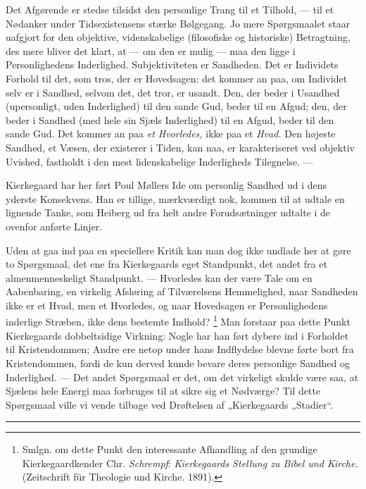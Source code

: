 \documentclass[12pt,a4paper,openany]{book}
\newcommand{\opage}[1]{\marginnote{\footnotesize\textit{[#1]}}}
\begin{document}
Det Afgørende er stedse tilsidst den personlige Trang til et Tilhold, --- til
et Nødanker under Tidsexistensens stærke Bølgegang. Jo mere Spørgsmaalet staar
uafgjort for den objektive, videnskabelige (filosofiske og historiske)
Betragtning, des mere bliver det klart, at --- om den er mulig --- maa den
ligge i Personlighedens Inderlighed. Subjektiviteten er Sandheden. Det er
Individets Forhold til det, som tros, der er Hovedsagen: det kommer an paa, om
Individet selv er i Sandhed, selvom det, det tror, er usandt. Den, der beder i
Usandhed (upersonligt, uden Inderlighed) til den sande Gud, beder til en Afgud;
den, der beder i Sandhed (med hele sin Sjæls Inderlighed) til en Afgud, beder
til den sande Gud. Det kommer an paa \textit{et Hvorledes,} ikke paa et
\textit{Hvad.} Den højeste Sandhed, et Væsen, der existerer i Tiden, kan naa,
er karakteriseret ved objektiv Uvished, fastholdt i den mest lidenskabelige
Inderligheds Tilegnelse. ---

Kierkegaard har her ført Poul Møllers Ide om personlig Sandhed ud i dens
yderste Konsekvens. Han er tillige, mærkværdigt nok, kommen til at udtale en
lignende Tanke, som Heiberg ud fra helt andre Forudsætninger udtalte i de
ovenfor anførte Linjer.

Uden at gaa ind paa en speciellere Kritik kan man dog ikke undlade her at gøre
to Spørgsmaal, det ene fra Kierkegaards eget Standpunkt, det andet fra et
almenmenneskeligt Standpunkt. --- Hvorledes kan der være Tale om en
Aabenbaring, en virkelig Afsløring af Tilværelsens Hemmelighed, naar Sandheden
ikke er et Hvad, men et Hvorledes, og naar Hovedsagen er Personlighedens
inderlige Stræben, ikke dens bestemte Indhold?%
\footnote[1]{Smlgn. om dette Punkt den interessante Afhandling af den grundige
Kierkegaardkender Chr. \emph{Schrempf}: \textit{Kierkegaards Stellung zu Bibel
und Kirche.} (Zeitschrift für Theologie und Kirche. 1891).} Man forstaar paa
dette Punkt Kierkegaards dobbeltsidige Virkning: Nogle har han ført dybere
\setcounter{footnote}{0}%
\opage{156}ind i Forholdet til Kristendommen; Andre ere netop under hans
Indflydelse blevne førte bort fra Kristendommen, fordi de kun derved kunde
bevare deres personlige Sandhed og Inderlighed. --- Det andet Spørgsmaal er
det, om det virkeligt skulde være saa, at Sjælens hele Energi maa forbruges til
at sikre sig et Nødværge? Til dette Spørgsmaal ville vi vende tilbage ved
Drøftelsen af „Kierkegaards „Stadier“.

\begin{center}\rule{2cm}{0.4pt}\end{center}
\end{document}
